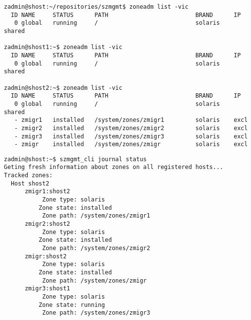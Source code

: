 \begin{lstlisting}[basicstyle=\scriptsize\ttfamily, caption={Stav zóny na serverech po migraci}, float,label={code:test:migration:list}]  
zadmin@shost:~/repositories/szmgmt$ zoneadm list -vic
  ID NAME     STATUS      PATH                         BRAND      IP    
   0 global   running     /                            solaris    shared

zadmin@shost1:~$ zoneadm list -vic
  ID NAME     STATUS      PATH                         BRAND      IP    
   0 global   running     /                            solaris    shared
   
zadmin@shost2:~$ zoneadm list -vic
  ID NAME     STATUS      PATH                         BRAND      IP    
   0 global   running     /                            solaris    shared
   - zmigr1   installed   /system/zones/zmigr1         solaris    excl  
   - zmigr2   installed   /system/zones/zmigr2         solaris    excl
   - zmigr3   installed   /system/zones/zmigr3         solaris    excl  
   - zmigr    installed   /system/zones/zmigr          solaris    excl  
\end{lstlisting}
\begin{lstlisting}[basicstyle=\scriptsize\ttfamily, caption={Uživatelský žurnál po migraci}, float,label={code:test:migration:after}]  
zadmin@shost:~$ szmgmt_cli journal status
Geting fresh information about zones on all registered hosts...
Tracked zones:  
  Host shost2
      zmigr1:shost2
           Zone type: solaris
          Zone state: installed
           Zone path: /system/zones/zmigr1
      zmigr2:shost2
           Zone type: solaris
          Zone state: installed
           Zone path: /system/zones/zmigr2
      zmigr:shost2
           Zone type: solaris
          Zone state: installed
           Zone path: /system/zones/zmigr  
      zmigr3:shost1
           Zone type: solaris
          Zone state: running
           Zone path: /system/zones/zmigr3
\end{lstlisting}

